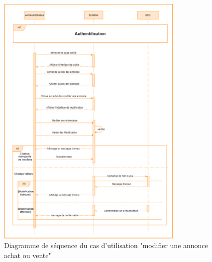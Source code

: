 \documentclass[edit,12pt,a4paper,ChapStyle,oneside,doubleinterligne]{report}
\begin{document}
\begin{figure}[h!]\label{fig:Diagramme cas 7}
\centering
\includegraphics[width=0.8\textwidth]{images/moddifier annonce.png}
\caption{Diagramme de séquence du cas d'utilisation "modifier une annonce achat ou vente"}
\end{figure}

\clearpage
\end{document}
